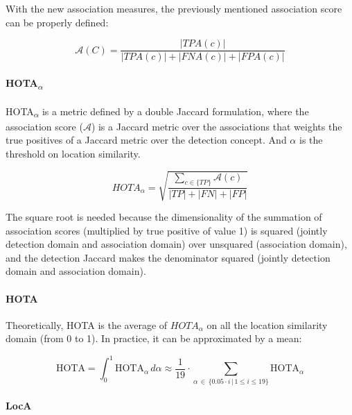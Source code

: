 {
    With the new association measures, the previously mentioned association score can be properly defined:
}

\begin{equation}
    \label{eqn:association score}
    \mathcal{A}(C) = \frac{|TPA(c)|}{|TPA(c)| + |FNA(c)| + |FPA(c)|}
\end{equation}

\paragraph{\ac{HOTA}\textsubscript{$\alpha$}}

{
    \ac{HOTA}\textsubscript{$\alpha$} is a metric defined by a double Jaccard formulation, where the association score ($\mathcal{A}$) is a Jaccard metric over the associations that weights the true positives of a Jaccard metric over the detection concept. 
    And $\alpha$ is the threshold on location similarity.
}

\begin{equation}
    \label{eqn:hota alpha}
    HOTA_{\alpha} = \sqrt{\frac{\sum_{c \in \{TP\}} \mathcal{A}(c)}{|TP| + |FN| + |FP|}}
\end{equation}

{
    The square root is needed because the dimensionality of the summation of association scores (multiplied by true positive of value 1) is squared (jointly detection domain and association domain) over unsquared (association domain), and the detection Jaccard makes the denominator squared (jointly detection domain and association domain).
}

\paragraph{\ac{HOTA}}

{
    Theoretically, \ac{HOTA} is the average of $HOTA_{\alpha}$ on all the location similarity domain (from 0 to 1). In practice, it can be approximated by a mean:
}

\begin{equation}
    \label{eqn:hota}
    \text{HOTA} = \int_{0}^{1} \text{HOTA}_{\alpha} \, d\alpha \approx \frac{1}{19} \cdot \sum_{\alpha \, \in \, \{0.05 \cdot i \,|\, 1 \leq i \leq 19\}} \text{HOTA}_{\alpha}
\end{equation}

\paragraph{LocA}

